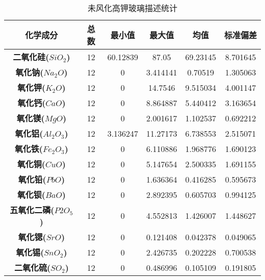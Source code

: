 \documentclass[withoutpreface,bwprint]{cumcmthesis} %
\begin{document}
\begin{table}
	\caption{未风化高钾玻璃描述统计}\label{tab:001} \centering
	\centering
	\setlength{\tabcolsep}{3mm}%
	\begin{tabular}{cccccc}
		\toprule[1.5pt]
		
		\textbf{化学成分}&\textbf{总数}& \textbf{最小值} &\textbf{最大值}&\textbf{均值}&\textbf{标准偏差}  \\  %
		\midrule[1pt]
		\textbf{二氧化硅($SiO_2$)}&	12&	60.12839&	87.05&	69.23145&	8.701645\\
		\textbf{氧化钠($Na_2O$)}&12&	0&	3.414141&	0.70519	&1.305063\\
		\textbf{氧化钾($K_2O$)}&12&	0&	14.7546	&9.515034&	4.001147\\
		\textbf{氧化钙($CaO$) }&12&	0&	8.864887&	5.440412&	3.163654\\
		\textbf{ 氧化镁($MgO$)}&12&	0&	2.001617&	1.102537&	0.692212\\
		\textbf{氧化铝($Al_2O_3$) } &12&	3.136247&	11.27173&	6.738553&	2.515071\\
		\textbf{氧化铁($Fe_2O_3$) }  &12&	0&	6.110886&	1.968776&	1.690123\\
		\textbf{ 氧化铜($CuO$)} &12&	0&	5.147654&	2.500335&	1.691155\\
		\textbf{氧化铅($PbO$) } &12&	0&	1.636364&	0.416285&	0.595673\\
		\textbf{ 氧化钡($BaO$)} &12&	0&	2.892395&	0.605703&	0.994125\\
		\textbf{ 五氧化二磷($P2O_5$)} &12&	0&	4.552813&	1.426007&	1.448627\\
		\textbf{ 氧化锶($SrO$)} &12&	0&	0.121408&	0.042378&	0.049065\\
		\textbf{ 氧化锡($SnO_2$)} &12&	0&	2.426735&	0.202228&	0.700538\\
		\textbf{二氧化硫($SO_2$) } &12&	0&	0.486996&	0.105109&	0.191805\\
		
		
		\bottomrule[1.5pt]
	\end{tabular}
\end{table}
 
\end{document}
